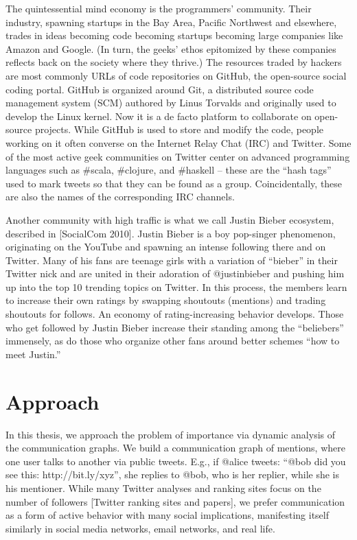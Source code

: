 	The quintessential mind economy is the programmers’ community.  Their industry, spawning startups in the Bay Area, Pacific Northwest and elsewhere, trades in ideas becoming code becoming startups becoming large companies like Amazon and Google.  (In turn, the geeks' ethos epitomized by these companies reflects back on the society where they thrive.)  The resources traded by hackers are most commonly URLs of code repositories on GitHub, the open-source social coding portal.  GitHub is organized around Git, a distributed source code management system (SCM) authored by Linus Torvalds and originally used to develop the Linux kernel.  Now it is a de facto platform to collaborate on open-source projects.  While GitHub is used to store and modify the code, people working on it often converse on the Internet Relay Chat (IRC) and Twitter.  Some of the most active geek communities on Twitter center on advanced programming languages such as \#scala, \#clojure, and \#haskell -- these are the ``hash tags'' used to mark tweets so that they can be found as a group.  Coincidentally, these are also the names of the corresponding IRC channels.
	
	Another community with high traffic is what we call Justin Bieber ecosystem, described in [SocialCom 2010].  Justin Bieber is a boy pop-singer phenomenon, originating on the YouTube and spawning an intense following there and on Twitter.  Many of his fans are teenage girls with a variation of “bieber” in their Twitter nick and are united in their adoration of @justinbieber and pushing him up into the top 10 trending topics on Twitter.  In this process, the members learn to increase their own ratings by swapping shoutouts (mentions) and trading shoutouts for follows.  An economy of rating-increasing behavior develops.  Those who get followed by Justin Bieber increase their standing among the “beliebers” immensely, as do those who organize other fans around better schemes “how to meet Justin.”

\section{Approach}
	
	In this thesis, we approach the problem of importance via dynamic analysis of the communication graphs. We build a communication graph of mentions, where one user talks to another via public tweets.  E.g., if @alice tweets: “@bob did you see this: http://bit.ly/xyz”, she replies to @bob, who is her replier, while she is his mentioner.  While many Twitter analyses and ranking sites focus on the number of followers [Twitter ranking sites and papers], we prefer communication as a form of active behavior with many social implications, manifesting itself similarly in social media networks, email networks, and real life.
	
